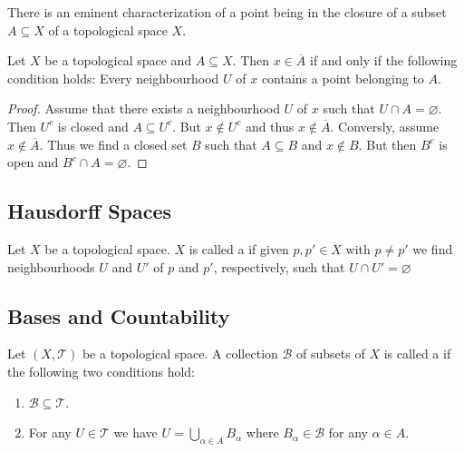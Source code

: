 There is an eminent characterization of a point being in the closure of a subset $A \subseteq X$ of a topological space $X$.

\begin{proposition}
	Let $X$ be a topological space and $A \subseteq X$. Then $x \in \overline{A}$ if and only if the following condition holds: Every neighbourhood $U$ of $x$ contains a point belonging to $A$.
	\label{prop:characterization_closure}
\end{proposition}

\begin{proof}
	Assume that there exists a neighbourhood $U$ of $x$ such that $U \cap A = \varnothing$. Then $U^c$ is closed and $A \subseteq U^c$. But $x \notin U^c$ and thus $x \notin \overline{A}$. Conversly, assume $x \notin \overline{A}$. Thus we find a closed set $B$ such that $A \subseteq B$ and $x \notin B$. But then $B^c$ is open and $B^c \cap A = \varnothing$.
\end{proof}

\subsection{Hausdorff Spaces}

\begin{definition}
	Let $X$ be a topological space. $X$ is called a  if given $p,p' \in X$ with $p \neq p'$ we find neighbourhoods $U$ and $U'$ of $p$ and $p'$, respectively, such that $U \cap U' = \varnothing$	
\end{definition}

\subsection{Bases and Countability}

\begin{definition}
	Let $(X,\mathcal{T})$ be a topological space. A collection $\mathcal{B}$ of subsets of $X$ is called a  if the following two conditions hold:

	\begin{enumerate}
		\item $\mathcal{B} \subseteq \mathcal{T}$.
		\item For any $U \in \mathcal{T}$ we have $U = \bigcup_{\alpha \in A} B_\alpha$ where $B_\alpha \in \mathcal{B}$ for any $\alpha \in A$.
	\end{enumerate}
	\label{def:basis_topology}
\end{definition}

